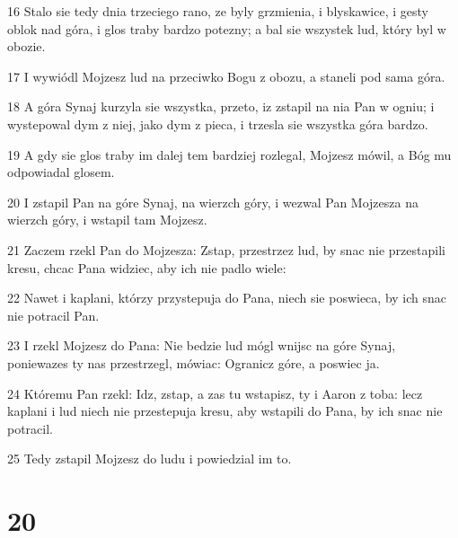 \par 16 Stalo sie tedy dnia trzeciego rano, ze byly grzmienia, i blyskawice, i gesty oblok nad góra, i glos traby bardzo potezny; a bal sie wszystek lud, który byl w obozie.
\par 17 I wywiódl Mojzesz lud na przeciwko Bogu z obozu, a staneli pod sama góra.
\par 18 A góra Synaj kurzyla sie wszystka, przeto, iz zstapil na nia Pan w ogniu; i wystepowal dym z niej, jako dym z pieca, i trzesla sie wszystka góra bardzo.
\par 19 A gdy sie glos traby im dalej tem bardziej rozlegal, Mojzesz mówil, a Bóg mu odpowiadal glosem.
\par 20 I zstapil Pan na góre Synaj, na wierzch góry, i wezwal Pan Mojzesza na wierzch góry, i wstapil tam Mojzesz.
\par 21 Zaczem rzekl Pan do Mojzesza: Zstap, przestrzez lud, by snac nie przestapili kresu, chcac Pana widziec, aby ich nie padlo wiele:
\par 22 Nawet i kaplani, którzy przystepuja do Pana, niech sie poswieca, by ich snac nie potracil Pan.
\par 23 I rzekl Mojzesz do Pana: Nie bedzie lud mógl wnijsc na góre Synaj, poniewazes ty nas przestrzegl, mówiac: Ogranicz góre, a poswiec ja.
\par 24 Któremu Pan rzekl: Idz, zstap, a zas tu wstapisz, ty i Aaron z toba: lecz kaplani i lud niech nie przestepuja kresu, aby wstapili do Pana, by ich snac nie potracil.
\par 25 Tedy zstapil Mojzesz do ludu i powiedzial im to.

\chapter{20}

